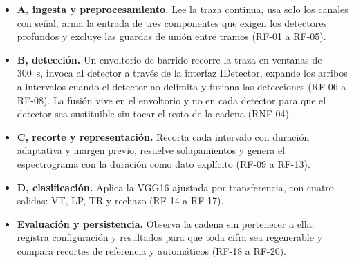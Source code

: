 \documentclass[12pt,oneside,spanish,oldfontcommands]{memoir}
\begin{document}
\begin{itemize}
\item \textbf{A, ingesta y preprocesamiento.} Lee la traza continua, usa solo
los canales con señal, arma la entrada de tres componentes que exigen los
detectores profundos y excluye las guardas de unión entre tramos (RF-01 a
RF-05).
\item \textbf{B, detección.} Un envoltorio de barrido recorre la traza en
ventanas de 300~s, invoca al detector a través de la interfaz
\textsf{IDetector}, expande los arribos a intervalos cuando el detector no
delimita y fusiona las detecciones (RF-06 a RF-08). La fusión vive en el
envoltorio y no en cada detector para que el detector sea sustituible sin
tocar el resto de la cadena (RNF-04).
\item \textbf{C, recorte y representación.} Recorta cada intervalo con
duración adaptativa y margen previo, resuelve solapamientos y genera el
espectrograma con la duración como dato explícito (RF-09 a RF-13).
\item \textbf{D, clasificación.} Aplica la VGG16 ajustada por transferencia,
con cuatro salidas: VT, LP, TR y rechazo (RF-14 a RF-17).
\item \textbf{Evaluación y persistencia.} Observa la cadena sin pertenecer a
ella: registra configuración y resultados para que toda cifra sea
regenerable y compara recortes de referencia y automáticos (RF-18 a RF-20).
\end{itemize}
\end{document}
